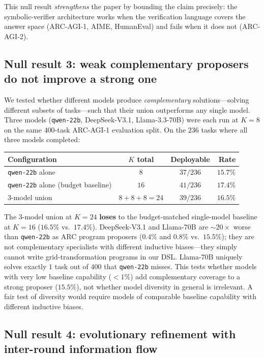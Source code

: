 \documentclass[11pt]{amsart}
\newcommand\1{{\mathds{1}}}
\theoremstyle{definition}
\theoremstyle{remark}
\numberwithin{equation}{section}
\begin{document}
This null result \emph{strengthens} the paper by bounding the claim precisely: the symbolic-verifier architecture works when the verification language covers the answer space (ARC-AGI-1, AIME, HumanEval) and fails when it does not (ARC-AGI-2).

\subsection{Null result 3: weak complementary proposers do not improve a strong one}\label{sec:act2-heterogeneous}

We tested whether different models produce \emph{complementary} solutions---solving different subsets of tasks---such that their union outperforms any single model.
Three models (\texttt{qwen-22b}, DeepSeek-V3.1, Llama-3.3-70B) were each run at $K\!=\!8$ on the same $400$-task ARC-AGI-1 evaluation split.
On the $236$ tasks where all three models completed:

\begin{center}\small
\begin{tabular}{lccr}
\toprule
Configuration & $K$ total & Deployable & Rate \\
\midrule
\texttt{qwen-22b} alone & $8$ & $37/236$ & $15.7\%$ \\
\texttt{qwen-22b} alone (budget baseline) & $16$ & $41/236$ & $17.4\%$ \\
$3$-model union & $8{+}8{+}8{=}24$ & $39/236$ & $16.5\%$ \\
\bottomrule
\end{tabular}
\end{center}

The $3$-model union at $K\!=\!24$ \textbf{loses} to the budget-matched single-model baseline at $K\!=\!16$ ($16.5\%$ vs.\ $17.4\%$).
DeepSeek-V3.1 and Llama-70B are $\sim\!20\times$ worse than \texttt{qwen-22b} as ARC program proposers ($0.4\%$ and $0.8\%$ vs.\ $15.5\%$); they are not complementary specialists with different inductive biases---they simply cannot write grid-transformation programs in our DSL.
Llama-70B uniquely solves exactly $1$ task out of $400$ that \texttt{qwen-22b} misses.
This tests whether models with very low baseline capability ($<1\%$) add complementary coverage to a strong proposer ($15.5\%$), not whether model diversity in general is irrelevant.
A fair test of diversity would require models of comparable baseline capability with different inductive biases.

\subsection{Null result 4: evolutionary refinement with inter-round information flow}\label{sec:act2-evolutionary}
\end{document}
